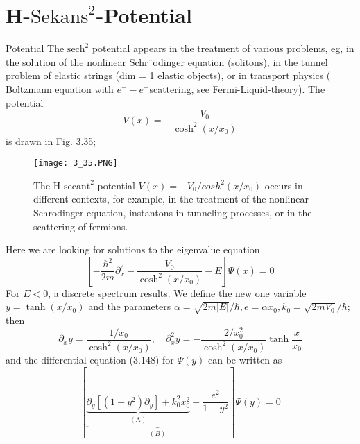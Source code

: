 \section{H-$\text{Sekans}^2$-Potential}
Potential The $\text{sech}^2$ potential appears in the treatment of various problems, eg, in the solution of the nonlinear Schr¨odinger equation (solitons), in the tunnel problem of elastic strings (dim = 1 elastic objects), or in transport physics ( Boltzmann equation with $e^- - e^-$scattering, see Fermi-Liquid-theory). The potential
\begin{equation}
    V(x)=-\frac{V_{0}}{\cosh ^{2}\left(x / x_{0}\right)}
    \end{equation}
is drawn in Fig. 3.35;
\begin{figure}[ht]
    \begin{minipage}{0.5\textwidth}
        \centering
        \texttt{[image: 3\_35.PNG]}
    \end{minipage}
    \begin{minipage}{0.5\textwidth}
        \caption{The $\text{H-secant}^2$ potential $V (x) = -V_0 / cosh^2(x / x_0)$ occurs in different contexts, for example, in the treatment of the nonlinear Schrodinger equation, instantons in tunneling processes, or in the scattering of fermions.}
    \end{minipage}
\end{figure}
Here we are looking for solutions to the eigenvalue equation
\begin{equation}
    \left[-\frac{\hbar^{2}}{2 m} \partial_{x}^{2}-\frac{V_{0}}{\cosh ^{2}\left(x / x_{0}\right)}-E\right] \Psi(x)=0
    \end{equation}
For $E <0$, a discrete spectrum results. We define the new one variable $y = \operatorname{tanh} (x / x_0)$ and the parameters $\alpha = \sqrt{2m | E |}/\hbar, e = \alpha x_0, k_0 = \sqrt{2mV_0} / \hbar$; then
\begin{equation}
    \partial_{x} y=\frac{1 / x_{0}}{\cosh ^{2}\left(x / x_{0}\right)}, \quad \partial_{x}^{2} y=-\frac{2 / x_{0}^{2}}{\cosh ^{2}\left(x / x_{0}\right)} \tanh \frac{x}{x_{0}}
    \end{equation}
and the differential equation (3.148) for $\Psi(y)$ can be written as
\begin{equation}
    \left[\underbrace{\underbrace{\partial_{y}\left[\left(1-y^{2}\right) \partial_{y}\right]+k_{0}^{2} x_{0}^{2}}_{(\mathrm{A})}-\frac{e^{2}}{1-y^{2}}}_{(B)}\right] \Psi(y)=0
    \end{equation}
